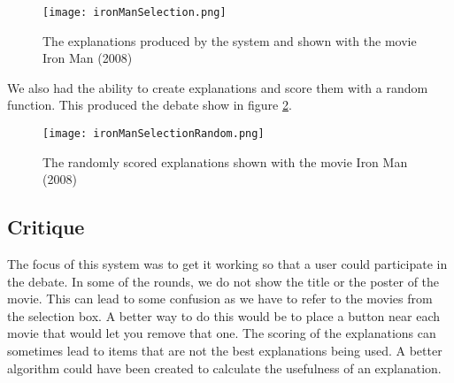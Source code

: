                 \begin{figure}[!htb]
                    \texttt{[image: ironManSelection.png]} 
                    \caption{The explanations produced by the system and shown with the movie Iron Man (2008)}
                    \label{fig:ironManSelection}
                \end{figure}

                We also had the ability to create explanations and score them with a random function. This produced the debate show in figure \ref{fig:ironManSelectionRandom}.

                \begin{figure}[!htb]
                    \texttt{[image: ironManSelectionRandom.png]} 
                    \caption{The randomly scored explanations shown with the movie Iron Man (2008)}
                    \label{fig:ironManSelectionRandom}
                \end{figure}

            
            \subsection{Critique}
                The focus of this system was to get it working so that a user could participate in the debate. In some of the rounds, we do not show the title or the poster of the movie. This can lead to some confusion as we have to refer to the movies from the selection box. A better way to do  this would be to place a button near each movie that would let you remove that one. The scoring of the explanations can sometimes lead to items that are not the best explanations being used. A better algorithm could have been created to calculate the usefulness of an explanation.


